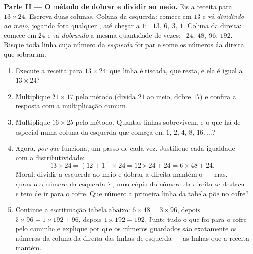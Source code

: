 \begin{problem}
\medskip
\noindent\textbf{Parte II --- O método de dobrar e dividir ao meio.}
Eis a receita para $13 \times 24$. Escreva duas colunas. Coluna da
esquerda: comece em $13$ e vá \emph{dividindo ao meio}, jogando fora
qualquer , até chegar a $1$: \ $13,\ 6,\ 3,\ 1$. Coluna da
direita: comece em $24$ e vá \emph{dobrando} a mesma quantidade de
vezes: \ $24,\ 48,\ 96,\ 192$. Risque toda linha cuja número da
\emph{esquerda} for par e some os números da direita que sobraram.
\begin{enumerate}[resume]
  \item Execute a receita para $13 \times 24$: que linha é riscada, que
         resta, e ela é igual a $13 \times 24$?
  \item Multiplique $21 \times 17$ pelo método (divida $21$ ao meio,
        dobre $17$) e confira a resposta com a multiplicação comum.
  \item Multiplique $16 \times 25$ pelo método. Quantas linhas
        sobrevivem, e o que há de especial numa coluna da esquerda que
        começa em $1$, $2$, $4$, $8$, $16, \dots$?
  \item Agora, \emph{por que} funciona, um passo de cada vez.
        Justifique cada igualdade com a distributividade:
        \[
        13 \times 24 = (12 + 1) \times 24
        = 12 \times 24 + 24 = 6 \times 48 + 24 .
        \]
        Moral: dividir a esquerda ao meio e dobrar a direita mantém o
         --- mas, quando o número da esquerda é \emph{},
        uma cópia do número da direita se destaca e tem de ir para o
        cofre. Que número a primeira linha da tabela põe no cofre?
  \item Continue a escrituração tabela abaixo:
        $6 \times 48 = 3 \times 96$, depois
        $3 \times 96 = 1 \times 192 + 96$, depois
        $1 \times 192 = 192$. Junte tudo o que foi para o cofre pelo
        caminho e explique por que os números guardados são exatamente
        os números da coluna da direita das linhas de esquerda 
        --- as linhas que a receita mantém.
\end{enumerate}


\end{problem}

